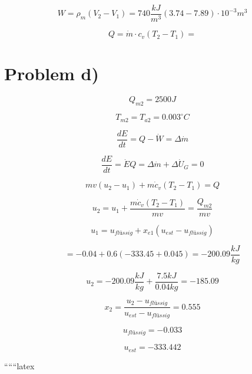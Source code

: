 \[
W = \rho_m (V_2 - V_1) = 740 \frac{kJ}{m^3} (3.74 - 7.89) \cdot 10^{-3} m^3
\]

\[
Q = \dot{m} \cdot c_v (T_2 - T_1) =
\]

\section*{Problem d)}

\[
Q_{m2} = 2500 J
\]

\[
T_{m2} = T_{a2} = 0.003^\circ C
\]

\[
\frac{dE}{dt} = Q - \dot{W} = \Delta \dot{m}
\]

\[
\frac{dE}{dt} = \dot{E}Q = \Delta \dot{m} + \Delta \dot{U}_G = 0
\]

\[
m v (u_2 - u_1) + m \dot{c}_v (T_2 - T_1) = Q
\]

\[
u_2 = u_1 + \frac{m \dot{c}_v (T_2 - T_1)}{m v} = \frac{Q_{m2}}{m v}
\]

\[
u_1 = u_{flüssig} + x_{e1} (u_{est} - u_{flüssig})
\]

\[
= -0.04 + 0.6 (-333.45 + 0.045) = -200.09 \frac{kJ}{kg}
\]

\[
u_2 = -200.09 \frac{kJ}{kg} + \frac{7.5 kJ}{0.04 kg} = -185.09
\]

\[
x_2 = \frac{u_2 - u_{flüssig}}{u_{est} - u_{flüssig}} = 0.555
\]

\[
u_{flüssig} = -0.033
\]

\[
u_{est} = -333.442
\]

``````latex


